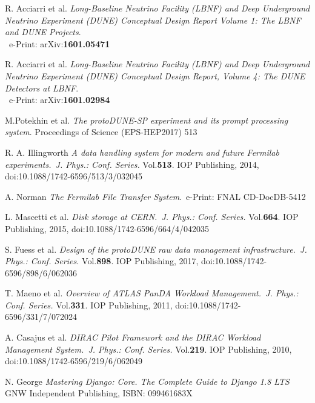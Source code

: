\documentclass{webofc}
\begin{document}
\begin{thebibliography}{99}

R. Acciarri et al.
\emph{Long-Baseline Neutrino Facility (LBNF) and Deep Underground Neutrino Experiment (DUNE) Conceptual Design Report Volume 1: The LBNF and DUNE Projects}.\\ ~e-Print: arXiv:\textbf{1601.05471}

R. Acciarri et al.
\emph{Long-Baseline Neutrino Facility (LBNF) and Deep Underground Neutrino Experiment (DUNE) Conceptual Design Report, Volume 4: The DUNE Detectors at LBNF}.\\~e-Print: arXiv:\textbf{1601.02984}

 M.Potekhin et al. \emph{The protoDUNE-SP experiment and its prompt
processing system}. Proceedings of Science (EPS-HEP2017) 513



R. A. Illingworth \emph{A data handling system for modern and future Fermilab experiments.~J. Phys.: Conf. Series.} Vol.\textbf{513}. IOP Publishing, 2014,
doi:10.1088/1742-6596/513/3/032045

A. Norman \emph{The Fermilab File Transfer System}.~e-Print: FNAL CD-DocDB-5412

 L. Mascetti et al. \emph{Disk storage at CERN.~J. Phys.: Conf. Series.} Vol.\textbf{664}. IOP Publishing, 2015,
doi:10.1088/1742-6596/664/4/042035

S. Fuess et al. \emph{Design of the protoDUNE raw data management
infrastructure.~J. Phys.: Conf. Series.} Vol.\textbf{898}. IOP Publishing, 2017,
doi:10.1088/1742-6596/898/6/062036


T. Maeno et al. \emph{Overview of ATLAS PanDA Workload Management.~J. Phys.: Conf. Series.} Vol.\textbf{331}. IOP Publishing, 2011,
doi:10.1088/1742-6596/331/7/072024



A. Casajus et al.  \emph{DIRAC Pilot Framework and the DIRAC
Workload Management System.~J. Phys.: Conf. Series.} Vol.\textbf{219}. IOP Publishing, 2010,
doi:10.1088/1742-6596/219/6/062049

N. George \emph{Mastering Django: Core. The Complete Guide to Django 1.8 LTS}~ GNW Independent Publishing, ISBN: 099461683X


\end{thebibliography}
\end{document}
